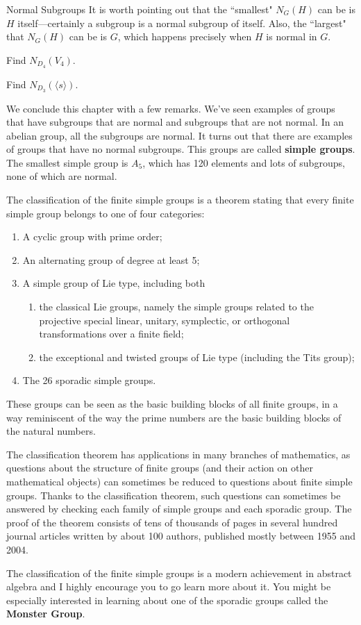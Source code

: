 \begin{section}{Normal Subgroups}
It is worth pointing out that the ``smallest" \(N_G(H)\) can be is \(H\) itself---certainly a subgroup is a normal subgroup of itself.  Also, the ``largest" that \(N_G(H)\) can be is \(G\), which happens precisely when \(H\) is normal in \(G\).

\begin{exercise}
Find \(N_{D_4}(V_4)\).
\end{exercise}

\begin{exercise}
Find \(N_{D_3}(\langle s\rangle)\).
\end{exercise}

We conclude this chapter with a few remarks.  We've seen examples of groups that have subgroups that are normal and subgroups that are not normal.  In an abelian group, all the subgroups are normal.  It turns out that there are examples of groups that have no normal subgroups.  This groups are called \textbf{simple groups}.  The smallest simple group is \(A_5\), which has 120 elements and lots of subgroups, none of which are normal.


The classification of the finite simple groups is a theorem stating that every finite simple group belongs to one of four categories:
\begin{enumerate}
\item A cyclic group with prime order;
\item An alternating group of degree at least 5;
\item A simple group of Lie type, including both 
\begin{enumerate}
\item the classical Lie groups, namely the simple groups related to the projective special linear, unitary, symplectic, or orthogonal transformations over a finite field;
\item the exceptional and twisted groups of Lie type (including the Tits group);
\end{enumerate}
\item The 26 sporadic simple groups.
\end{enumerate}
These groups can be seen as the basic building blocks of all finite groups, in a way reminiscent of the way the prime numbers are the basic building blocks of the natural numbers.

The classification theorem has applications in many branches of mathematics, as questions about the structure of finite groups (and their action on other mathematical objects) can sometimes be reduced to questions about finite simple groups. Thanks to the classification theorem, such questions can sometimes be answered by checking each family of simple groups and each sporadic group.  The proof of the theorem consists of tens of thousands of pages in several hundred journal articles written by about 100 authors, published mostly between 1955 and 2004.

The classification of the finite simple groups is a modern achievement in abstract algebra and I highly encourage you to go learn more about it.  You might be especially interested in learning about one of the sporadic groups called the \textbf{Monster Group}.

\end{section}
